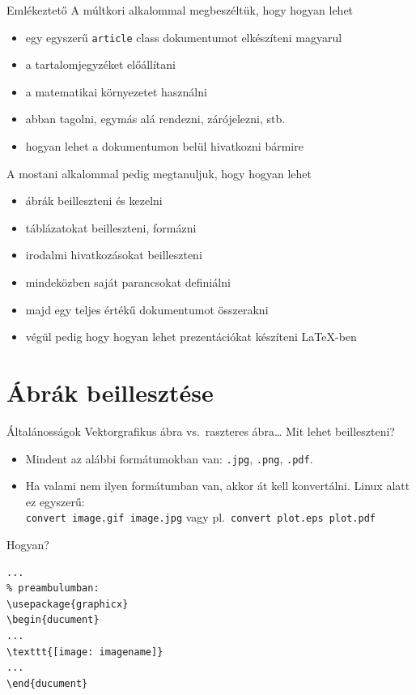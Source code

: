 \documentclass{beamer} %
\newcommand{\myemph}[1]{{\color{blue}#1}}
\begin{document}
 \begin{frame}{Emlékeztető}
  A \myemph{múltkori alkalommal} megbeszéltük, hogy hogyan lehet
  \begin{itemize}
   \item egy egyszerű \lstinline|article| class dokumentumot elkészíteni magyarul
   \item a tartalomjegyzéket előállítani
   \item a matematikai környezetet használni
   \item abban tagolni, egymás alá rendezni, zárójelezni, stb.
   \item hogyan lehet a dokumentumon belül hivatkozni bármire
  \end{itemize}
  A \myemph{mostani alkalommal} pedig megtanuljuk, hogy hogyan lehet
  \begin{itemize}
   \item ábrák beilleszteni és kezelni
   \item táblázatokat beilleszteni, formázni
   \item irodalmi hivatkozásokat beilleszteni
   \item mindeközben saját parancsokat definiálni
   \item majd egy teljes értékű dokumentumot összerakni
   \item végül pedig hogy hogyan lehet prezentációkat készíteni \LaTeX{}-ben
  \end{itemize}
 \end{frame}
 
\section{Ábrák beillesztése}
\begin{frame}[fragile]{Általánosságok}
 Vektorgrafikus ábra vs.\ raszteres ábra\dots
 \myemph{Mit lehet beilleszteni?}
 \begin{itemize}
  \item Mindent az alábbi formátumokban van: \lstinline|.jpg|, \lstinline|.png|, \lstinline|.pdf|.
  \item Ha valami nem ilyen formátumban van, akkor át kell konvertálni. Linux alatt ez egyszerű:\\ \lstinline|convert image.gif image.jpg| vagy pl.\ \lstinline|convert plot.eps plot.pdf|
 \end{itemize}
 \myemph{Hogyan?}
\begin{lstlisting}[basicstyle=\scriptsize]
...
% preambulumban:
\usepackage{graphicx}
\begin{ducument}
...
\texttt{[image: imagename]}
...
\end{ducument}
\end{lstlisting}
\end{frame}
\end{document}
